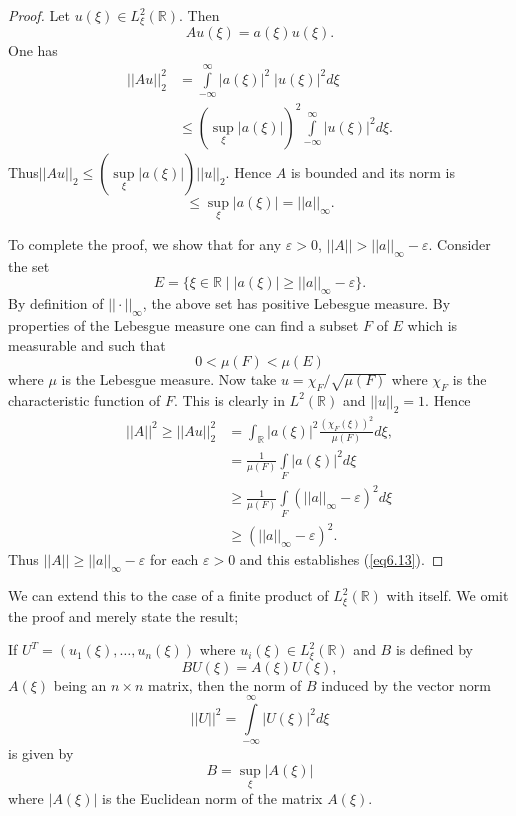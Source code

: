 \begin{proof}
Let $u(\xi) \in L^2_\xi (\mathbb{R})$. Then
$$
Au(\xi) = a(\xi) u(\xi). 
$$
One has 
\begin{align*}
||Au||^2_2 & = \int\limits^\infty_{-\infty} |a(\xi)|^2 \; |u(\xi)|^2 d
\xi\\
& \leq (\sup\limits_\xi |a(\xi)|)^2 \int\limits^\infty_{-\infty}
|u(\xi)|^2 d \xi.
\end{align*}
Thus\pageoriginale $||Au||_2 \leq (\sup\limits_\xi |a(\xi)|)
||u||_2$. Hence $A$ is bounded and its norm is 
$$
\leq \sup\limits_{\xi} |a(\xi)| = ||a||_\infty.
$$

To complete the proof, we show that for any $\varepsilon > 0$,
$||A||>||a||_\infty - \varepsilon$. Consider the set
$$
E = \{ \xi \in \mathbb{R} \mid |a(\xi) | \geq ||a||_\infty -
\varepsilon\}. 
$$
By definition of $||\cdot ||_\infty$, the above set has positive
Lebesgue measure. By properties of the Lebesgue measure one can find a
subset $F$ of $E$ which is measurable and such that 
$$
0< \mu (F) < \mu (E)
$$
where $\mu$ is the Lebesgue measure. Now take $u = \chi_{F} /
\sqrt{\mu(F)}$ where $\chi_F$ is the characteristic function of
$F$. This is clearly in $L^2 (\mathbb{R})$ and $||u||_2 =1$. Hence
\begin{align*}
||A||^2 \geq ||Au||^2_2 & = \int_\mathbb{R} |a(\xi)|^2
\frac{(\chi_F(\xi))^2}{\mu(F)} d \xi,\\
& = \frac{1}{\mu(F)} \int\limits_F |a(\xi)|^2 d \xi\\
& \geq \frac{1}{\mu(F)} \int\limits_F (||a||_\infty - \varepsilon)^2 d
\xi\\
& \geq (||a||_\infty - \varepsilon)^2.
\end{align*}
Thus $||A|| \geq ||a||_\infty - \varepsilon$ for each $\varepsilon >
0$ and this establishes (\ref{eq6.13}).
\end{proof}

We can extend this to the case of a finite product of $L^2_\xi
(\mathbb{R})$ with itself. We omit the proof and merely state the
result;

\begin{lem}\label{chap6:lem6.2}
If $U^T = (u_1 (\xi), \ldots , u_n (\xi))$ where $u_i (\xi) \in
L^2_\xi (\mathbb{R})$ and $B$ is defined by 
\begin{equation*}
BU(\xi) = A (\xi) U(\xi), \tag{6.14}\label{eq6.14}
\end{equation*}\pageoriginale 
$A(\xi)$ being an $n \times n$ matrix, then the norm of $B$ induced by
the vector norm 
\begin{equation*}
||U||^2 = \int\limits^\infty_{-\infty} |U(\xi)|^2 d \xi \tag{6.15}\label{eq6.15}
\end{equation*}
is given by
\begin{equation*} 
B = \sup\limits_\xi |A(\xi)|
\tag{6.16}\label{eq6.16}
\end{equation*}
where $|A(\xi)|$ is the Euclidean norm of the matrix $A(\xi)$.
\end{lem}

